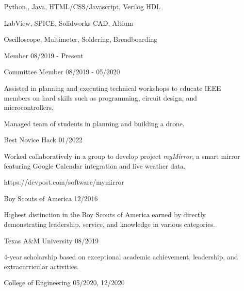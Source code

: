 \documentclass[11pt]{article}
\begin{document}
      {Python,\CPP, Java, HTML/CSS/Javascript, Verilog HDL}

      {LabView, SPICE, Solidworks CAD, Altium}

      {Oscilloscope, Multimeter, Soldering, Breadboarding}


\begin{description}
\squish
{}
           {Member}
           {08/2019 - Present}

           {Committee Member}
           {08/2019 - 05/2020}

Assisted in planning and executing technical workshops to educate IEEE members on hard skills
such as programming, circuit design, and microcontrollers.

Managed team of students in planning and building a drone.

           {Best Novice Hack}
           {01/2022}

Worked collaboratively in a group to develop project \emph{myMirror}, a smart mirror featuring
Google Calendar integration and live weather data.

https://devpost.com/software/mymirror

\end{description}


\begin{description}
\squish
{}
           {Boy Scouts of America}
           {12/2016}

Highest distinction in the Boy Scouts of America earned by directly demonstrating
leadership, service, and knowledge in various categories.

           {Texas A\&M University}
           {08/2019}

4-year scholarship based on exceptional academic achievement, leadership, and extracurricular activities.

           {College of Engineering}
           {05/2020, 12/2020}

\end{description}
\end{document}
